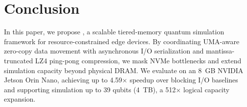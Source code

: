 \section{Conclusion}
\label{sec:conclusion}

In this paper, we propose \EdgeQuantum, a scalable tiered-memory quantum simulation framework for resource-constrained edge devices. By coordinating UMA-aware zero-copy data movement with asynchronous I/O serialization and mantissa-truncated LZ4 ping-pong compression, we mask NVMe bottlenecks and extend simulation capacity beyond physical DRAM. We evaluate \EdgeQuantum on an 8~GB NVIDIA Jetson Orin Nano, achieving up to 4.59$\times$ speedup over blocking I/O baselines and supporting simulation up to 39 qubits (4~TB), a 512$\times$ logical capacity expansion.

